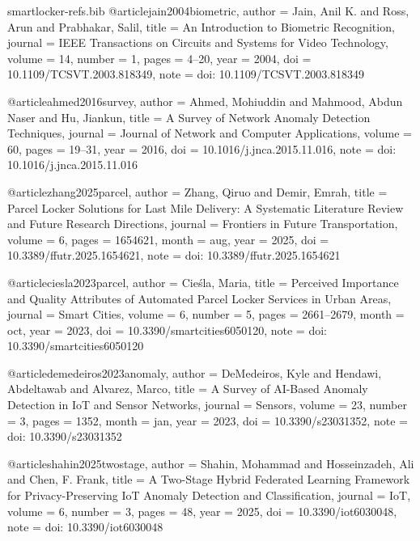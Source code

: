 \begin{filecontents*}[overwrite]{smartlocker-refs.bib}
@article{jain2004biometric,
  author  = {Jain, Anil K. and Ross, Arun and Prabhakar, Salil},
  title   = {An Introduction to Biometric Recognition},
  journal = {IEEE Transactions on Circuits and Systems for Video Technology},
  volume  = {14},
  number  = {1},
  pages   = {4--20},
  year    = {2004},
  doi     = {10.1109/TCSVT.2003.818349},
  note    = {doi: 10.1109/TCSVT.2003.818349}
}

@article{ahmed2016survey,
  author  = {Ahmed, Mohiuddin and Mahmood, Abdun Naser and Hu, Jiankun},
  title   = {A Survey of Network Anomaly Detection Techniques},
  journal = {Journal of Network and Computer Applications},
  volume  = {60},
  pages   = {19--31},
  year    = {2016},
  doi     = {10.1016/j.jnca.2015.11.016},
  note    = {doi: 10.1016/j.jnca.2015.11.016}
}


@article{zhang2025parcel,
  author  = {Zhang, Qiruo and Demir, Emrah},
  title   = {Parcel Locker Solutions for Last Mile Delivery: A Systematic Literature Review and Future Research Directions},
  journal = {Frontiers in Future Transportation},
  volume  = {6},
  pages   = {1654621},
  month   = aug,
  year    = {2025},
  doi     = {10.3389/ffutr.2025.1654621},
  note    = {doi: 10.3389/ffutr.2025.1654621}
}

@article{ciesla2023parcel,
  author  = {Cie{\'s}la, Maria},
  title   = {Perceived Importance and Quality Attributes of Automated Parcel Locker Services in Urban Areas},
  journal = {Smart Cities},
  volume  = {6},
  number  = {5},
  pages   = {2661--2679},
  month   = oct,
  year    = {2023},
  doi     = {10.3390/smartcities6050120},
  note    = {doi: 10.3390/smartcities6050120}
}

@article{demedeiros2023anomaly,
  author  = {DeMedeiros, Kyle and Hendawi, Abdeltawab and Alvarez, Marco},
  title   = {A Survey of {AI}-Based Anomaly Detection in {IoT} and Sensor Networks},
  journal = {Sensors},
  volume  = {23},
  number  = {3},
  pages   = {1352},
  month   = jan,
  year    = {2023},
  doi     = {10.3390/s23031352},
  note    = {doi: 10.3390/s23031352}
}

@article{shahin2025twostage,
  author  = {Shahin, Mohammad and Hosseinzadeh, Ali and Chen, F. Frank},
  title   = {A Two-Stage Hybrid Federated Learning Framework for Privacy-Preserving {IoT} Anomaly Detection and Classification},
  journal = {IoT},
  volume  = {6},
  number  = {3},
  pages   = {48},
  year    = {2025},
  doi     = {10.3390/iot6030048},
  note    = {doi: 10.3390/iot6030048}
}


\end{filecontents*}
